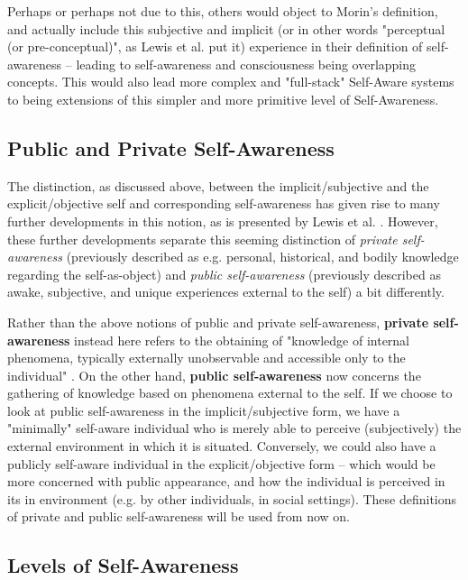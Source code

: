 	Perhaps or perhaps not due to this, others would object to Morin's definition, and actually include this subjective and implicit (or in other words "perceptual (or pre-conceptual)", as Lewis et al. \cite{sacs16_ch2} put it) experience in their definition of self-awareness -- leading to self-awareness and consciousness being overlapping concepts. This would also lead more complex and "full-stack" Self-Aware systems to being extensions of this simpler and more primitive level of Self-Awareness.


	\subsection{Public and Private Self-Awareness}

	The distinction, as discussed above, between the implicit/subjective and the explicit/objective self and corresponding self-awareness has given rise to many further developments in this notion, as is presented by Lewis et al. \cite{sacs16_ch2}. However, these further developments separate this seeming distinction of \textit{private self-awareness} (previously described as e.g. personal, historical, and bodily knowledge regarding the self-as-object) and \textit{public self-awareness} (previously described as awake, subjective, and unique experiences external to the self) a bit differently.

	Rather than the above notions of public and private self-awareness, \textbf{private self-awareness} instead here refers to the obtaining of "knowledge of internal phenomena, typically externally unobservable and accessible only to the individual" \cite{sacs16_ch2}. On the other hand, \textbf{public self-awareness} now concerns the gathering of knowledge based on phenomena external to the self. If we choose to look at public self-awareness in the implicit/subjective form, we have a "minimally" self-aware individual who is merely able to perceive (subjectively) the external environment in which it is situated. Conversely, we could also have a publicly self-aware individual in the explicit/objective form -- which would be more concerned with public appearance, and how the individual is perceived in its in environment (e.g. by other individuals, in social settings). These definitions of private and public self-awareness will be used from now on.


	\subsection{Levels of Self-Awareness}

